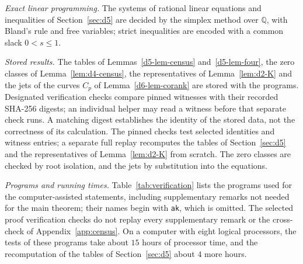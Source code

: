 \documentclass[11pt]{amsart}
\theoremstyle{definition}
\theoremstyle{remark}
\newcommand{\code}[1]{\begingroup\def\_{\textunderscore\allowbreak}\texttt{#1}\endgroup}
\begin{document}
\emph{Exact linear programming.}  The systems of rational linear equations and inequalities of
Section~\ref{sec:d5} are decided by the simplex method over $\mathbb Q$, with Bland's rule and free
variables; strict inequalities are encoded with a common slack $0<s\le1$.

\emph{Stored results.}  The tables of Lemmas~\ref{d5-lem-census} and~\ref{d5-lem-four}, the
zero classes of Lemma~\ref{lem:d4-census}, the representatives of Lemma~\ref{lem:d2-K} and the
jets of the curves $C_p$ of Lemma~\ref{d6-lem-corank} are stored with the programs.  Designated
verification checks compare pinned witnesses with their recorded SHA-256 digests; an individual
helper may read a witness before that separate check runs.  A matching digest establishes the
identity of the stored data, not the correctness of its calculation.  The pinned checks test
selected identities and witness entries; a separate full replay recomputes the tables of
Section~\ref{sec:d5} and the representatives of Lemma~\ref{lem:d2-K} from scratch.  The zero
classes are checked by root isolation, and the jets by substitution into the equations.

\emph{Programs and running times.}  Table~\ref{tab:verification} lists the programs used for
the computer-assisted statements, including supplementary remarks not needed for the main
theorem; their names begin with \code{ak\_}, which is omitted.  The selected proof verification
checks do not replay every supplementary remark or the cross-check of Appendix~\ref{app:census}.
On a computer with eight logical processors, the tests of these programs take about $15$ hours
of processor time, and the recomputation of the tables of Section~\ref{sec:d5} about $4$ more
hours.
\end{document}
